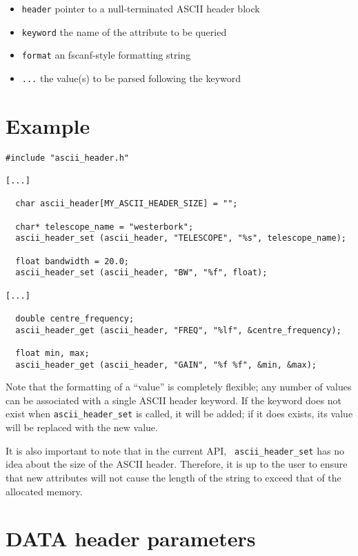 \begin{itemize}
\item {\tt header} pointer to a null-terminated ASCII header block

\item {\tt keyword} the name of the attribute to be queried

\item {\tt format} an fscanf-style formatting string

\item {\tt ...} the value(s) to be parsed following the keyword
\end{itemize}

\section{Example}

\begin{verbatim}
#include "ascii_header.h"

[...]

  char ascii_header[MY_ASCII_HEADER_SIZE] = "";

  char* telescope_name = "westerbork";
  ascii_header_set (ascii_header, "TELESCOPE", "%s", telescope_name);

  float bandwidth = 20.0;
  ascii_header_set (ascii_header, "BW", "%f", float);

[...]

  double centre_frequency;
  ascii_header_get (ascii_header, "FREQ", "%lf", &centre_frequency);

  float min, max;
  ascii_header_get (ascii_header, "GAIN", "%f %f", &min, &max);
\end{verbatim}

Note that the formatting of a ``value'' is completely flexible; any
number of values can be associated with a single ASCII header keyword.
If the keyword does not exist when {\tt ascii\_header\_set} is called,
it will be added; if it does exists, its value will be replaced with
the new value.

It is also important to note that in the current API, {\tt
ascii\_header\_set} has no idea about the size of the ASCII header.
Therefore, it is up to the user to ensure that new attributes will not
cause the length of the string to exceed that of the allocated memory.

\section{DATA header parameters}

